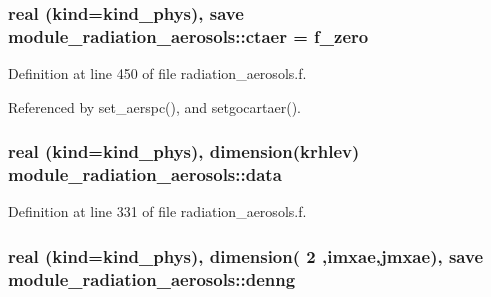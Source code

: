 \subsubsection[{\texorpdfstring{ctaer}{ctaer}}]{\setlength{\rightskip}{0pt plus 5cm}real (kind=kind\+\_\+phys), save module\+\_\+radiation\+\_\+aerosols\+::ctaer = {\bf f\+\_\+zero}\hspace{0.3cm}{\ttfamily [private]}}\hypertarget{namespacemodule__radiation__aerosols_a4b0aa142aee31c40361dadc390ccc68e}{}\label{namespacemodule__radiation__aerosols_a4b0aa142aee31c40361dadc390ccc68e}


Definition at line 450 of file radiation\+\_\+aerosols.\+f.



Referenced by set\+\_\+aerspc(), and setgocartaer().

\subsubsection[{\texorpdfstring{data}{data}}]{\setlength{\rightskip}{0pt plus 5cm}real (kind=kind\+\_\+phys), dimension({\bf krhlev}) module\+\_\+radiation\+\_\+aerosols\+::data\hspace{0.3cm}{\ttfamily [private]}}\hypertarget{namespacemodule__radiation__aerosols_a1248e740e53498ed7a06f7d475b1fb25}{}\label{namespacemodule__radiation__aerosols_a1248e740e53498ed7a06f7d475b1fb25}


Definition at line 331 of file radiation\+\_\+aerosols.\+f.

\subsubsection[{\texorpdfstring{denng}{denng}}]{\setlength{\rightskip}{0pt plus 5cm}real (kind=kind\+\_\+phys), dimension( 2 ,{\bf imxae},{\bf jmxae}), save module\+\_\+radiation\+\_\+aerosols\+::denng\hspace{0.3cm}{\ttfamily [private]}}\hypertarget{namespacemodule__radiation__aerosols_a0ccc698bc870cb6ccbc1c2b64a3f45f6}{}\label{namespacemodule__radiation__aerosols_a0ccc698bc870cb6ccbc1c2b64a3f45f6}


